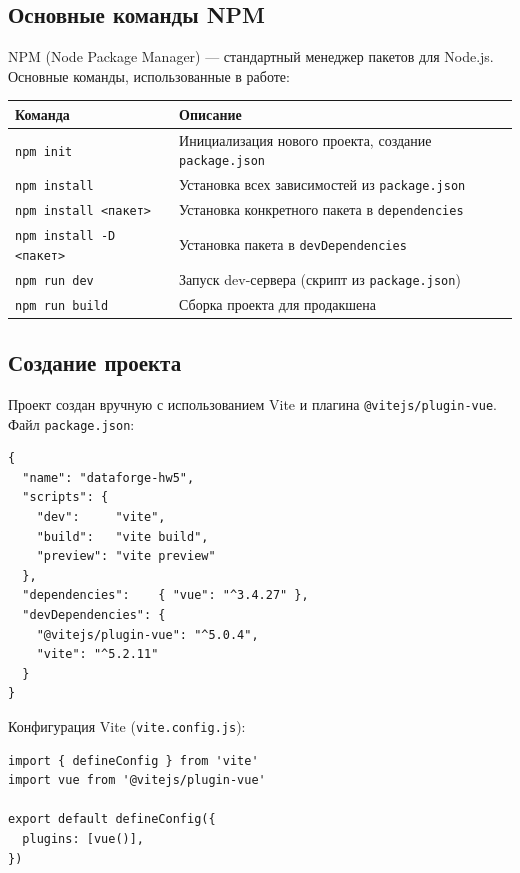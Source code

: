 \documentclass[12pt,a4paper]{article}
\begin{document}
\subsection{Основные команды NPM}

NPM (Node Package Manager) — стандартный менеджер пакетов для Node.js. Основные команды, использованные в работе:

\begin{center}
\begin{tabular}{ll}
\toprule
Команда & Описание \\
\midrule
\texttt{npm init}              & Инициализация нового проекта, создание \texttt{package.json} \\
\texttt{npm install}           & Установка всех зависимостей из \texttt{package.json} \\
\texttt{npm install \textless пакет\textgreater}   & Установка конкретного пакета в \texttt{dependencies} \\
\texttt{npm install -D \textless пакет\textgreater} & Установка пакета в \texttt{devDependencies} \\
\texttt{npm run dev}           & Запуск dev-сервера (скрипт из \texttt{package.json}) \\
\texttt{npm run build}         & Сборка проекта для продакшена \\
\bottomrule
\end{tabular}
\end{center}

\subsection{Создание проекта}

Проект создан вручную с использованием Vite и плагина \texttt{@vitejs/plugin-vue}. Файл \texttt{package.json}:

\begin{lstlisting}[language={}]
{
  "name": "dataforge-hw5",
  "scripts": {
    "dev":     "vite",
    "build":   "vite build",
    "preview": "vite preview"
  },
  "dependencies":    { "vue": "^3.4.27" },
  "devDependencies": {
    "@vitejs/plugin-vue": "^5.0.4",
    "vite": "^5.2.11"
  }
}
\end{lstlisting}

Конфигурация Vite (\texttt{vite.config.js}):

\begin{lstlisting}[language={}]
import { defineConfig } from 'vite'
import vue from '@vitejs/plugin-vue'

export default defineConfig({
  plugins: [vue()],
})
\end{lstlisting}
\end{document}
